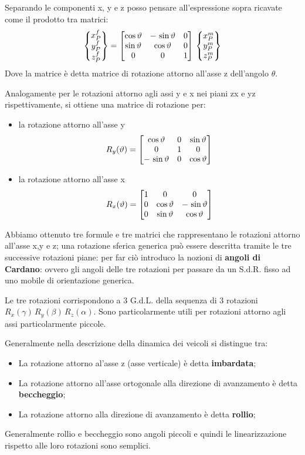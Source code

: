 Separando le componenti x, y e z posso pensare all'espressione sopra ricavate come il prodotto tra matrici:
\[\begin{Bmatrix}x_P^f\\y_P^f\\z_P^f\end{Bmatrix} = \begin{bmatrix}\cos{\vartheta}&-\,\sin{\vartheta}&0\\\sin{\vartheta}&\cos{\vartheta}&0\\0&0&1\end{bmatrix}\,\begin{Bmatrix}x_P^m\\y_P^m\\z_P^m\end{Bmatrix}\]
Dove la matrice è detta matrice di rotazione attorno all'asse z dell'angolo $\theta$.

Analogamente per le rotazioni attorno agli assi y e x nei piani zx e yz rispettivamente, si ottiene una matrice di rotazione per:
\begin{itemize}
\item la rotazione attorno all'asse y
\[R_y(\vartheta) = \begin{bmatrix}\cos{\vartheta}&0&\sin{\vartheta}\\0&1&0\\-\,\sin{\vartheta}&0&\cos{\vartheta}\end{bmatrix}\]
\item la rotazione attorno all'asse x
\[R_x(\vartheta) = \begin{bmatrix}1&0&0\\0&\cos{\vartheta}&-\,\sin{\vartheta}\\0&\sin{\vartheta}&\cos{\vartheta}\end{bmatrix}\]
\end{itemize}
Abbiamo ottenuto tre formule e tre matrici che rappresentano le rotazioni attorno all'asse x,y e z; una rotazione sferica generica può essere descritta tramite le tre successive rotazioni piane: per far ciò introduco la nozioni di \textbf{angoli di Cardano}: ovvero gli angoli delle tre rotazioni per passare da un S.d.R. fisso ad uno mobile di orientazione generica.

Le tre rotazioni corrispondono a 3 G.d.L. della sequenza di 3 rotazioni $R_x(\gamma)\,R_y(\beta)\,R_z(\alpha)$. Sono particolarmente utili per rotazioni attorno agli assi particolarmente piccole.

Generalmente nella descrizione della dinamica dei veicoli si distingue tra:
\begin{itemize}
\item La rotazione attorno al'asse z (asse verticale) è detta \textbf{imbardata};
\item La rotazione attorno all'asse ortogonale alla direzione di avanzamento è detta \textbf{beccheggio};
\item La rotazione attorno alla direzione di avanzamento è detta \textbf{rollio};
\end{itemize}

Generalmente rollio e beccheggio sono angoli piccoli e quindi le linearizzazione rispetto alle loro rotazioni sono semplici.\newline

